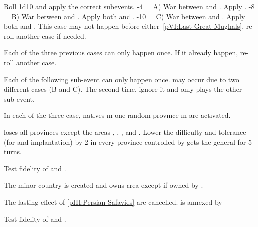 
\condition{}
\aparag Roll 1d10 and apply the correct subevents.
-4 = A) War between \paysmogol and \paysperse. Apply
.
-8 = B) War between \paysafghans and \paysperse. Apply both
 and .
-10 = C) War between \paysafghans and \paysmogol. Apply both
 and . This
case may not happen before either~\ref{pVI:Last Great Mughals}, re-roll
another case if needed.

\aparag Each of the three previous cases can only happen once. If it already
happen, re-roll another case.

\aparag Each of the following sub-event can only happen
once.  may occur due to two different cases
(B and C). The second time, ignore it and only plays the other sub-event.

\aparag In each of the three case, natives in one random province in
\continentIndia are activated.


\phevnt
\aparag \paysmogol loses all provinces except the areas \granderegionDelhi,
\granderegionAoudh, \granderegionBengale, \granderegionGondwana and
\granderegionOrissa.
\aparag Lower the difficulty and tolerance (for \COL and \TP implantation) by
2 in every province controlled by \paysmogol
\aparag \paysperse gets the general  for 5 turns.

\phdipl
\aparag Test fidelity of \paysPerse and \paysOrmus.



\phevnt
\aparag The minor country \paysafghans is created and owns area
\granderegionAfghanistan except \provinceHerat if owned by \paysPerse.



\phevnt
\aparag The lasting effect of \ref{pIII:Persian Safavids} are cancelled.
\aparag \provinceHerat is annexed by \paysafghans

\phdipl
\aparag Test fidelity of \paysPerse and \paysOrmus.


